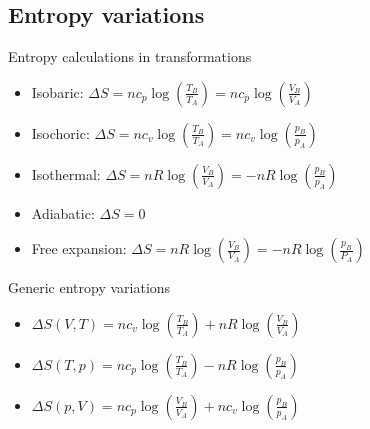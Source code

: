 \documentclass{aa}
\begin{document}
\subsection{Entropy variations}
Entropy calculations in transformations
\begin{itemize}
\item Isobaric: $\Delta S=nc_p\log\left( \frac{T_B}{T_A} \right)=nc_p\log\left( \frac{V_B}{V_A} \right)$\\
\item Isochoric: $\Delta S=nc_v\log\left( \frac{T_B}{T_A} \right)=nc_v\log\left( \frac{p_B}{p_A} \right)$\\
\item Isothermal: $\Delta S=nR\log\left( \frac{V_B}{V_A} \right)=-nR\log\left( \frac{p_B}{p_A} \right)$\\
\item Adiabatic: $\Delta S=0$
\item Free expansion: $\Delta S=nR\log\left( \frac{V_B}{V_A} \right)=-nR\log\left( \frac{p_B}{P_A} \right)$
\end{itemize}
Generic entropy variations
\begin{itemize}
\item $\Delta S(V, T) = nc_v\log\left( \frac{T_B}{T_A} \right)+nR\log\left( \frac{V_B}{V_A} \right)$
\item $\Delta S(T, p) = nc_p\log\left( \frac{T_B}{T_A} \right)-nR\log\left( \frac{p_B}{p_A} \right)$
\item $\Delta S(p, V) = nc_p\log\left( \frac{V_B}{V_A} \right)+nc_v\log\left( \frac{p_B}{p_A} \right)$
\end{itemize}
\end{document}
